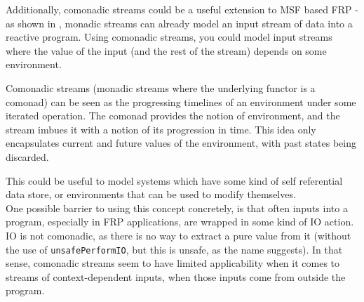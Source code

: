 Additionally, comonadic streams could be a useful extension to MSF based FRP - as shown in \cite{frp_refactored}, monadic streams can already model an input stream of data into a reactive program. Using comonadic streams, you could model input streams where the value of the input (and the rest of the stream) depends on some environment. 

Comonadic streams (monadic streams where the underlying functor is a comonad) can be seen as the progressing timelines of an environment under some iterated operation. The comonad provides the notion of environment, and the stream imbues it with a notion of its progression in time. This idea only encapsulates current and future values of the environment, with past states being discarded.

This could be useful to model systems which have some kind of self referential data store, or environments that can be used to modify themselves. \\

One possible barrier to using this concept concretely, is that often inputs into a program, especially in FRP applications, are wrapped in some kind of IO action. IO is not comonadic, as there is no way to extract a pure value from it (without the use of \verb+unsafePerformIO+, but this is unsafe, as the name suggests). In that sense, comonadic streams seem to have limited applicability when it comes to streams of context-dependent inputs, when those inputs come from outside the program.
